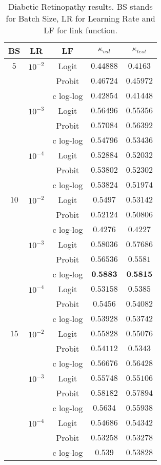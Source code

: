 \documentclass[10pt, a4paper, titlepage]{article}
\begin{document}
\begin{multicols}{2}
	\begin{table}[H]
		\footnotesize
		\centering
		\begin{tabular}{ccc|cc}
			BS & LR & LF & $\kappa_{val}$ & $\kappa_{test}$\\\hline\addlinespace[0.05cm]
			$5$ & $10^{-2}$ & Logit & $0.44888$ & $0.4163$\\
			& & Probit & $0.46724$ & $0.45972$\\
			& & c log-log & $0.42854$ & $0.41448$\\
			& $10^{-3}$ & Logit & $0.56496$ & $0.55356$\\
			& & Probit & $0.57084$ & $0.56392$\\
			& & c log-log & $0.54796$ & $0.53436$\\
			& $10^{-4}$ & Logit & $0.52884$ & $0.52032$\\
			& & Probit & $0.53802$ & $0.52302$\\
			& & c log-log & $0.53824$ & $0.51974$\\
			$10$ & $10^{-2}$ & Logit & $0.5497$ & $0.53142$\\
			& & Probit & $0.52124$ & $0.50806$\\
			& & c log-log & $0.4276$ & $0.4227$\\
			& $10^{-3}$ & Logit & $0.58036$ & $0.57686$\\
			& & Probit & $0.56536$ & $0.5581$\\
			& & c log-log & $\textbf{0.5883}$ & $\textbf{0.5815}$\\
			& $10^{-4}$ & Logit & $0.53158$ & $0.5385$\\
			& & Probit & $0.5456$ & $0.54082$\\
			& & c log-log & $0.53928$ & $0.53742$\\
			$15$ & $10^{-2}$ & Logit & $0.55828$ & $0.55076$\\
			& & Probit & $0.54112$ & $0.5343$\\
			& & c log-log & $0.56676$ & $0.56428$\\
			& $10^{-3}$ & Logit & $0.55748$ & $0.55106$\\
			& & Probit & $0.58182$ & $0.57894$\\
			& & c log-log & $0.5634$ & $0.55938$\\
			& $10^{-4}$ & Logit & $0.54686$ & $0.54342$\\
			& & Probit & $0.53258$ & $0.53278$\\
			& & c log-log & $0.539$ & $0.53828$
		\end{tabular}
		\caption{Diabetic Retinopathy results. BS stands for Batch Size, LR for Learning Rate and LF for link function.}
		\label{table:DRresults}
	\end{table}
	

\end{multicols}
\end{document}
